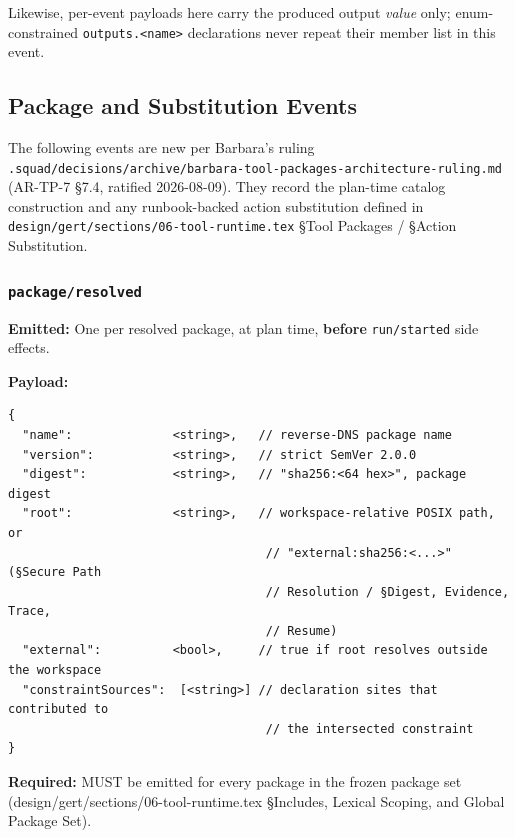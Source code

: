 Likewise, per-event payloads here carry the produced output \emph{value}
only; enum-constrained \texttt{outputs.<name>} declarations never repeat
their member list in this event.


\subsection{Package and Substitution Events}
\label{sec:pkg-events}

The following events are new per Barbara's ruling
\texttt{.squad/decisions/archive/barbara-tool-packages-architecture-ruling.md}
(AR-TP-7 §7.4, ratified 2026-08-09). They record the plan-time catalog
construction and any runbook-backed action substitution defined in
\texttt{design/gert/sections/06-tool-runtime.tex}
\S Tool Packages / \S Action Substitution.

\subsubsection{\texttt{package/resolved}}

\textbf{Emitted:} One per resolved package, at plan time, \textbf{before}
\texttt{run/started} side effects.

\textbf{Payload:}
\begin{verbatim}
{
  "name":              <string>,   // reverse-DNS package name
  "version":           <string>,   // strict SemVer 2.0.0
  "digest":            <string>,   // "sha256:<64 hex>", package digest
  "root":              <string>,   // workspace-relative POSIX path, or
                                    // "external:sha256:<...>" (§Secure Path
                                    // Resolution / §Digest, Evidence, Trace,
                                    // Resume)
  "external":          <bool>,     // true if root resolves outside the workspace
  "constraintSources":  [<string>] // declaration sites that contributed to
                                    // the intersected constraint
}
\end{verbatim}

\textbf{Required:} MUST be emitted for every package in the frozen package
set (design/gert/sections/06-tool-runtime.tex §Includes, Lexical Scoping,
and Global Package Set).


